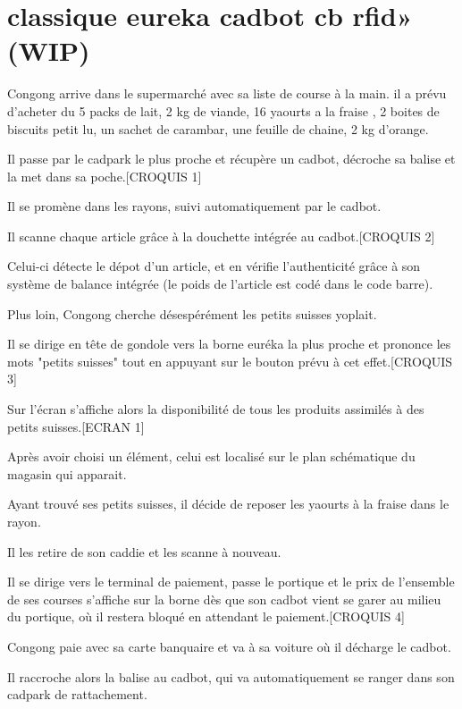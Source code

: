 \section{classique eureka cadbot cb rfid» (WIP)}

\par

\startitemize
\item Congong arrive dans le supermarché avec sa liste de course à la main. il a prévu d'acheter du 5 packs de lait, 2 kg de viande, 16 yaourts a la fraise , 2 boites de biscuits petit lu, un sachet de carambar, une feuille de chaine, 2 kg d'orange.
\item Il passe par le cadpark le plus proche et récupère un cadbot, décroche sa balise et la met dans sa poche.[CROQUIS 1]
\item Il se promène dans les rayons, suivi automatiquement par le cadbot.
\item Il scanne chaque article grâce à la douchette intégrée au cadbot.[CROQUIS 2]
\item Celui-ci détecte le dépot d'un article, et en vérifie l'authenticité grâce à son système 
de balance intégrée (le poids de l'article est codé dans le code barre).
\item Plus loin, Congong cherche désespérément les petits suisses yoplait.
\item Il se dirige en tête de gondole vers la borne euréka la plus proche et prononce les mots "petits suisses" tout en appuyant sur le bouton prévu à cet effet.[CROQUIS 3]
\item Sur l'écran s'affiche alors la disponibilité de tous les produits assimilés à des petits suisses.[ECRAN 1]
\item Après avoir choisi un élément, celui est localisé sur le plan schématique du magasin qui apparait.
\item Ayant trouvé ses petits suisses, il décide de reposer les yaourts à la fraise dans le rayon.
\item Il les retire de son caddie et les scanne à nouveau.
\item Il se dirige vers le terminal de paiement, passe le portique et le prix de l'ensemble de ses courses s'affiche sur la borne dès que son cadbot vient se garer au milieu du portique, où il restera bloqué en attendant le paiement.[CROQUIS 4]
\item Congong paie avec sa carte banquaire et va à sa voiture où il décharge le cadbot.
\item Il raccroche alors la balise au cadbot, qui va automatiquement se ranger dans son cadpark de rattachement.
\stopitemize

